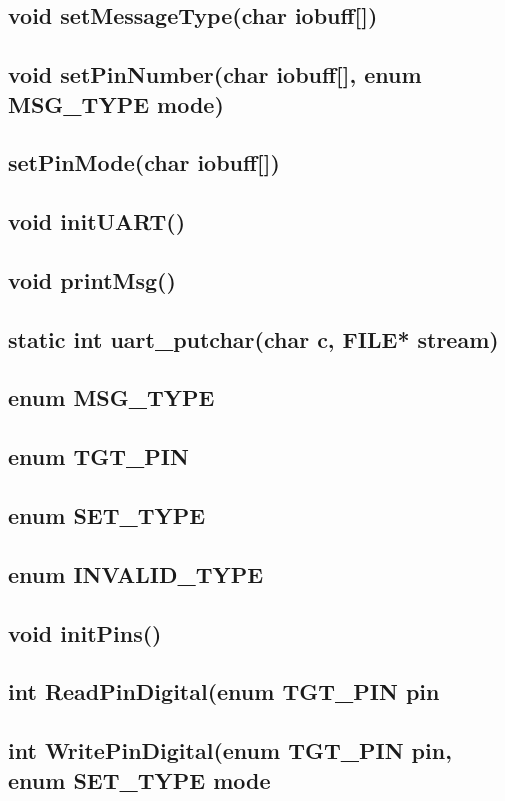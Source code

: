 \documentclass[letterpaper,11pt]{texMemo} %
\begin{document}
\subsection*{void setMessageType(char iobuff[])}

\subsection*{void setPinNumber(char iobuff[], enum MSG\_TYPE mode)}
\subsection*{setPinMode(char iobuff[])}

\subsection*{void initUART()}
\subsection*{void printMsg()}
\subsection*{static int uart\_putchar(char c, FILE* stream)}
\subsection*{enum MSG\_TYPE}
\subsection*{enum TGT\_PIN}
\subsection*{enum SET\_TYPE}
\subsection*{enum INVALID\_TYPE}
\subsection*{void initPins()}
\subsection*{int ReadPinDigital(enum TGT\_PIN pin}
\subsection*{int WritePinDigital(enum TGT\_PIN pin, enum SET\_TYPE mode}
\end{document}
